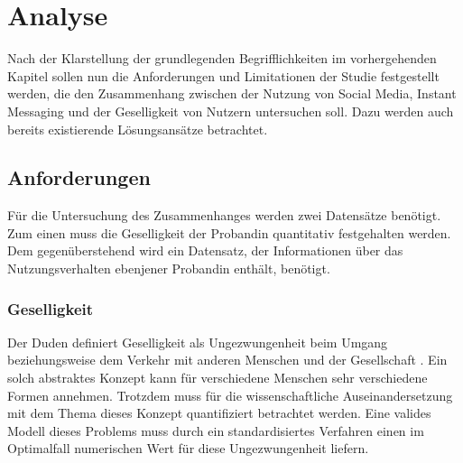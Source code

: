 
\chapter{Analyse}
\label{ch:Analyse}

Nach der Klarstellung der grundlegenden Begrifflichkeiten im vorhergehenden Kapitel
sollen nun die Anforderungen und Limitationen der Studie festgestellt werden, die den
Zusammenhang zwischen der Nutzung von Social Media, Instant Messaging und der Geselligkeit
von Nutzern untersuchen soll. 
Dazu werden auch bereits existierende Lösungsansätze betrachtet. 

\section{Anforderungen}
\label{ch:Analyse:sec:Anforderungen}


Für die Untersuchung des Zusammenhanges werden zwei Datensätze benötigt.
Zum einen muss die Geselligkeit der Probandin quantitativ festgehalten werden. 
Dem gegenüberstehend wird ein Datensatz, der Informationen über das Nutzungsverhalten ebenjener Probandin enthält, benötigt.
\par

\subsection{Geselligkeit}

Der Duden definiert Geselligkeit als Ungezwungenheit beim Umgang beziehungsweise dem Verkehr mit anderen Menschen und der Gesellschaft \cite{dudengesell}.
Ein solch abstraktes Konzept kann für verschiedene Menschen sehr verschiedene Formen annehmen.
Trotzdem muss für die wissenschaftliche Auseinandersetzung mit dem Thema dieses Konzept quantifiziert betrachtet werden.
Eine valides Modell dieses Problems muss durch ein standardisiertes Verfahren einen im Optimalfall numerischen Wert für diese Ungezwungenheit liefern. 
\par

